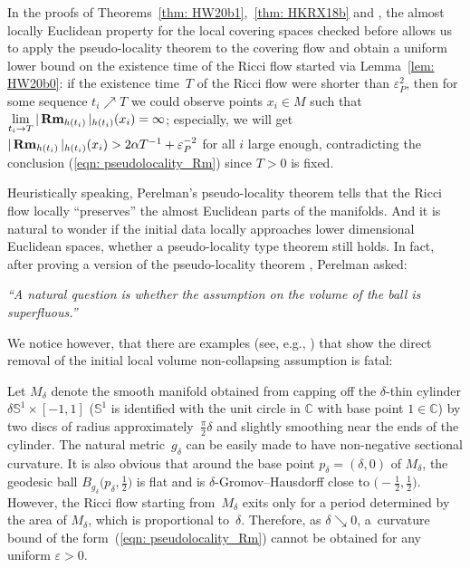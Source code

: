 \documentclass[pdftex]{sigma}
\numberwithin{equation}{section}
\newcommand{\Rm}{\operatorname{\bf Rm}}
\begin{document}
In the proofs of Theorems~\ref{thm: HW20b1},~\ref{thm: HKRX18b} and
\cite[Theorem~7.2]{Kapovitch19}, the almost locally Euclidean property for the
local covering spaces checked before allows us to apply the pseudo-locality
theorem to the covering flow and obtain a uniform lower bound on the existence
time of the Ricci flow started via Lemma~\ref{lem: HW20b0}: if the existence
time~$T$ of the Ricci flow were shorter than $\varepsilon_P^2$, then for some
sequence $t_i\nearrow T$ we could observe points $x_i\in M$ such that
$\lim\limits_{t_i\to T} |\Rm_{h(t_i)} |_{h(t_i)}(x_i)= \infty$; especially,
we will get $ |\Rm_{h(t_i)} |_{h(t_i)}(x_i)>2\alpha
T^{-1}+\varepsilon_P^{-2}$ for all $i$ large enough, contradicting the
conclusion (\ref{eqn: pseudolocality_Rm}) since $T>0$ is fixed.

Heuristically speaking, Perelman's pseudo-locality theorem tells that the Ricci
flow locally ``preserves'' the almost Euclidean parts of the manifolds. And it
is natural to wonder if the initial data locally approaches lower dimensional
Euclidean spaces, whether a pseudo-locality type theorem still holds. In fact,
after proving a version of the pseudo-locality theorem \cite[Theorem~10.3]{Perelman}, Perelman asked:

\emph{``A natural question is whether the assumption on the volume of the ball
is superfluous.''}

We notice however, that there are examples (see, e.g., \cite{Lu10, HKRX18}) that
show the direct removal of the initial local volume non-collapsing assumption
is fatal:
\begin{Example}[Topping]
Let $M_{\delta}$ denote the smooth manifold obtained from capping off the
$\delta$-thin cylinder $\delta \mathbb{S}^1\times [-1,1]$ ($\mathbb{S}^1$ is
identified with the unit circle in $\mathbb{C}$ with base point $1\in
\mathbb{C}$) by two discs of radius approximately~$\frac{\pi}{2}\delta$ and
slightly smoothing near the ends of the cylinder. The natural metric~$g_{\delta}$ can be easily made to have non-negative sectional curvature. It is
also obvious that around the base point $p_{\delta}=(\delta,0)$ of $M_{\delta}$,
the geodesic ball $B_{g_{\delta}}\big(p_{\delta},\frac{1}{2}\big)$ is flat and is
$\delta$-Gromov--Hausdorff close to $\big({-}\frac{1}{2},\frac{1}{2}\big)$.
 However, the Ricci flow starting from~$M_{\delta}$ exits only for a period
 determined by the area of $M_{\delta}$, which is proportional to~$\delta$.
 Therefore, as $\delta\searrow 0$, a~curvature bound of the form~(\ref{eqn:
 pseudolocality_Rm}) cannot be obtained for any uniform $\varepsilon>0$.
\end{Example}
\end{document}
